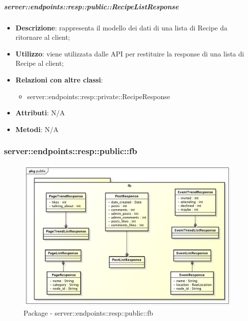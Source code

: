     \subparagraph{server::endpoints::resp::public::RecipeListResponse} %
    \label{subp:bdsm_app_server_endpoints_resp_private_recipelistresponse}
    \begin{itemize}
      \item \textbf{Descrizione}: rappresenta il modello dei dati di una lista di Recipe da ritornare al client;
      \item \textbf{Utilizzo}: viene utilizzata dalle API per restituire la response di una lista di Recipe al client;
      \item \textbf{Relazioni con altre classi}:
        \begin{itemize}
          \item server::endpoints::resp::private::RecipeResponse
        \end{itemize}
    \item \textbf{Attributi}: N/A
    \item \textbf{Metodi}: N/A
      \end{itemize}

\subsubsection{server::endpoints::resp::public::fb} %
\label{ssub:bdsm_app_server_endpoints_resp_public_fb}
\begin{figure}[!htbp]
  \centering
  \centerline{\includegraphics[scale=0.55]{./images/server/resp_fb.pdf}}
  \caption{Package - server::endpoints::resp::public::fb}
\end{figure}

